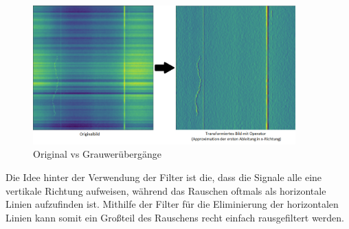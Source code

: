 \documentclass[12pt, a4paper]{article}
\begin{document}
\begin{figure}[t]
\centering
\includegraphics[width=0.9\textwidth]{img/original-vs-cv.png}
\caption{Original vs Grauwerübergänge}
\label{fig:ableitung}
\end{figure}

Die Idee hinter der Verwendung der Filter ist die, dass die Signale alle eine vertikale Richtung aufweisen, während das Rauschen oftmals als horizontale Linien aufzufinden ist. Mithilfe der Filter für die Eliminierung der horizontalen Linien kann somit ein Großteil des Rauschens recht einfach rausgefiltert werden.
\end{document}
